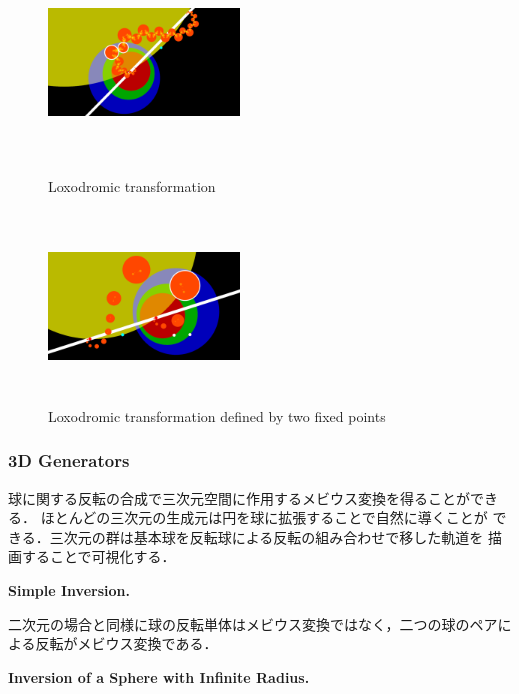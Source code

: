 \begin{figure}[htbp]
 \begin{minipage}[t]{0.5\hsize}
  \center
   \includegraphics[width=2in, height=2in, keepaspectratio]{../img/klein/2diis/loxoEdged.pdf}
   \caption{Loxodromic transformation}
   \label{fig:loxodromic2d}
 \end{minipage}
 \begin{minipage}[t]{0.5\hsize}
  \center
  \includegraphics[width=2in, height=2in,
  keepaspectratio]{../img/klein/2diis/loxoFixedEdged.pdf}
  \caption{Loxodromic transformation defined by two fixed points}
  \label{fig:loxoFixed}
 \end{minipage}
\end{figure}

\subsubsection{3D Generators}

球に関する反転の合成で三次元空間に作用するメビウス変換を得ることができる．
ほとんどの三次元の生成元は円を球に拡張することで自然に導くことが
できる．三次元の群は基本球を反転球による反転の組み合わせで移した軌道を
描画することで可視化する．

\noindent\textbf{Simple Inversion.}

二次元の場合と同様に球の反転単体はメビウス変換ではなく，二つの球のペアに
よる反転がメビウス変換である．

\noindent\textbf{Inversion of a Sphere with Infinite Radius.}

